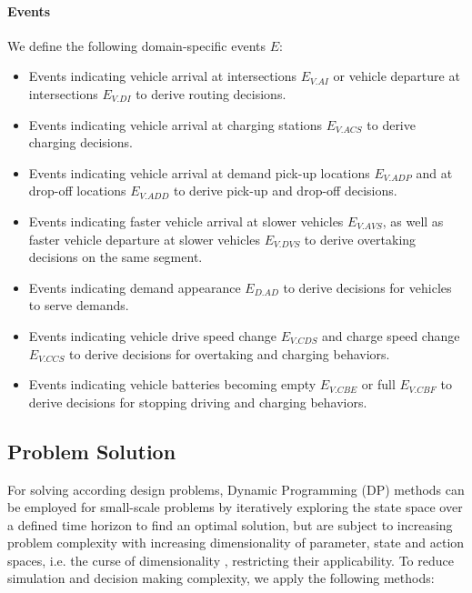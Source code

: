 \documentclass[a4paper,twoside]{article}
\begin{document}
	\paragraph{Events}
	We define the following domain-specific events $E$:
	\begin{itemize}
		\item Events indicating vehicle arrival at intersections $E_{V.AI}$ or vehicle departure at intersections $E_{V.DI}$ to derive routing decisions. 
		\item Events indicating vehicle arrival at charging stations $E_{V.ACS}$ to derive charging decisions. 
		\item Events indicating vehicle arrival at demand pick-up locations $E_{V.ADP}$ and at drop-off locations $E_{V.ADD}$ to derive pick-up and drop-off decisions. 
		\item Events indicating faster vehicle arrival at slower vehicles $E_{V.AVS}$, as well as faster vehicle departure at slower vehicles $E_{V.DVS}$ to derive overtaking decisions on the same segment.
		\item Events indicating demand appearance $E_{D.AD}$ to derive decisions for vehicles to serve demands.
		\item Events indicating vehicle drive speed change $E_{V.CDS}$ and charge speed change $E_{V.CCS}$ to derive decisions for overtaking and charging behaviors. 
		\item Events indicating vehicle batteries becoming empty $E_{V.CBE}$ or full $E_{V.CBF}$ to derive decisions for stopping driving and charging behaviors.
	\end{itemize}

\subsection{Problem Solution}
\label{sec:problem-solution}

For solving according design problems, Dynamic Programming (DP) \cite{bellman_dynamic_1957} methods can be employed for small-scale problems by iteratively exploring the state space over a defined time horizon to find an optimal solution,
but are subject to increasing problem complexity with increasing dimensionality of parameter, state and action spaces, i.e. the curse of dimensionality \cite{bellman_dynamic_1957}, restricting their applicability.
To reduce simulation and decision making complexity, we apply the following methods:
\end{document}
